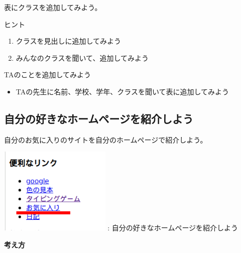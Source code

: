 \documentclass[a4paper,12pt]{jarticle}
\begin{document}
\bigskip

\bigskip

\bigskip

\theQuestion

表にクラスを追加してみよう。

ヒント

\begin{enumerate}
  \item クラスを見出しに追加してみよう
  \item
        みんなのクラスを聞いて、追加してみよう
\end{enumerate}
\theQuestion

TAのことを追加してみよう

\begin{itemize}
  \item
        TAの先生に名前、学校、学年、クラスを聞いて表に追加してみよう
\end{itemize}

\bigskip

\clearpage

\subsection{\theExercise 自分の好きなホームページを紹介しよう}
自分のお気に入りのサイトを自分のホームページで紹介しよう。



\centering
\begin{minipage}{\textwidth}
  {\upshape
    \centering
    \includegraphics[width=0.4\textwidth]{textbook-img193.png}
    \newline
    :
    自分の好きなホームページを紹介しよう}
\end{minipage}



\bigskip

\flushleft

\textbf{考え方}
\end{document}
